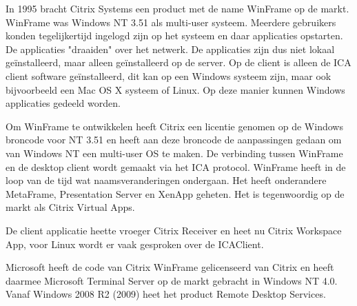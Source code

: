 In 1995 bracht Citrix Systems een product met de name WinFrame op de markt. WinFrame was Windows NT 3.51 als multi-user systeem. Meerdere gebruikers konden tegelijkertijd ingelogd zijn op het systeem en daar applicaties opstarten. De applicaties "draaiden" over het netwerk. De applicaties zijn dus niet lokaal ge\"installeerd, maar alleen ge\"installeerd op de server. Op de client is alleen de ICA client software ge\"installeerd, dit kan op een Windows systeem zijn, maar ook bijvoorbeeld een Mac OS X systeem of Linux. Op deze manier kunnen Windows applicaties gedeeld worden.

Om WinFrame te ontwikkelen heeft Citrix een licentie genomen op de Windows broncode voor NT 3.51 en heeft aan deze broncode de aanpassingen gedaan om van Windows NT een multi-user OS te maken. De verbinding tussen WinFrame en de desktop client wordt gemaakt via het ICA protocol. WinFrame heeft in de loop van de tijd wat naamsveranderingen ondergaan. Het heeft onderandere MetaFrame, Presentation Server en XenApp geheten. Het is tegenwoordig op de markt als Citrix Virtual Apps.

De client applicatie heette vroeger Citrix Receiver en heet nu Citrix Workspace App, voor Linux wordt er vaak gesproken over de ICAClient.

Microsoft heeft de code van Citrix WinFrame gelicenseerd van Citrix en heeft daarmee Microsoft Terminal Server op de markt gebracht in Windows NT 4.0. Vanaf Windows 2008 R2 (2009) heet het product Remote Desktop Services.
